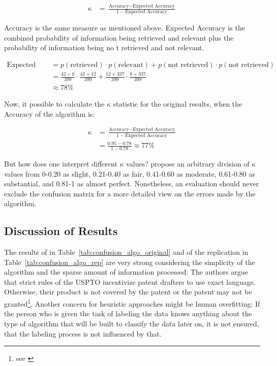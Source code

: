 \documentclass[12pt, a4paper]{scrartcl}
\theoremstyle{definition}
\begin{document}
\begin{align*}
\kappa &= \frac{\text{Accuracy} - \text{Expected Accuracy}}{1- \text{Expected Accuracy}}
\end{align*}

Accuracy is the same measure as mentioned above. Expected Accuracy is the
combined probability of information being retrieved and relevant plus the
probability of information being no t retrieved and not relevant.

\begin{align*}
\text{Expected Accuracy} &= p(\text{retrieved})\cdot p(\text{relevant}) + p(\text{not retrieved}) \cdot p(\text{not retrieved})\\
&= \frac{42 + 8}{399}\cdot\frac{42 + 12}{399} + \frac{12 + 337}{399}\cdot\frac{8+337}{399}\\
&\approx 78\%
\end{align*}

Now, it possible to calculate the $\kappa$ statistic for the original results,
when the Accuracy of the algorithm is:

\begin{align*}
\kappa &= \frac{\text{Accuracy} - \text{Expected Accuracy}}{1- \text{Expected Accuracy}}\\
&= \frac{0.95 - 0.78}{1-0.78} \approx 77\%
\end{align*}

But how does one interpret different $\kappa$ values?
\citet[p.~8]{landis1977measurement} propose an arbitrary division of $\kappa$
values from 0-0.20 as slight, 0.21-0.40 as fair, 0.41-0.60 as moderate,
0.61-0.80 as substantial, and 0.81-1 as almost perfect. Nonetheless, an
evaluation should never exclude the confusion matrix for a more detailed view
on the errors made by the algorithm.

\subsection{Discussion of Results} %
\label{ssub:discussion_of_results}

The results of \citet{bessen2007empirical} in
Table~\ref{tab:confusion_algo_original} and of the replication in
Table~\ref{tab:confusion_algo_rep} are very strong considering the simplicity
of the algorithm and the sparse amount of information processed. The authors
argue that strict rules of the USPTO incentivize patent drafters to use exact
language. Otherwise, their product is not covered by the patent or the patent
may not be granted\footnote{see \citet[pp.~7-9]{bessen2007empirical}}. Another
concern for heuristic approaches might be human overfitting: If the person who
is given the task of labeling the data knows anything about the type of
algorithm that will be built to classify the data later on, it is not ensured,
that the labeling process is not influenced by that.
\end{document}
